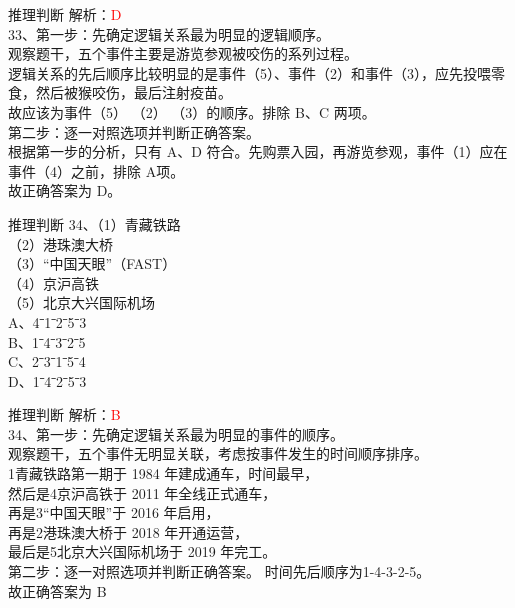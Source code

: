 \documentclass[aspectratio=169]{beamer}
\begin{document}
\begin{frame}[t]{推理判断}
    解析：\textcolor{red}{D}\\
    33、第一步：先确定逻辑关系最为明显的逻辑顺序。\\
    观察题干，五个事件主要是游览参观被咬伤的系列过程。\\
    逻辑关系的先后顺序比较明显的是事件（5）、事件（2）和事件（3），应先投喂零食，然后被猴咬伤，最后注射疫苗。\\
    故应该为事件（5） （2） （3）的顺序。排除 B、C 两项。\\
    第二步：逐一对照选项并判断正确答案。\\
    根据第一步的分析，只有 A、D 符合。先购票入园，再游览参观，事件（1）应在事件（4）之前，排除 A项。\\
    故正确答案为 D。\\
\end{frame}





\begin{frame}[t]{推理判断}
    34、（1）青藏铁路\\
    （2）港珠澳大桥\\
    （3）“中国天眼”（FAST）\\
    （4）京沪高铁\\
    （5）北京大兴国际机场\\
    A、4ˉ1ˉ2ˉ5ˉ3\\
    B、1ˉ4ˉ3ˉ2ˉ5\\
    C、2ˉ3ˉ1ˉ5ˉ4\\
    D、1ˉ4ˉ2ˉ5ˉ3\\
\end{frame}


\begin{frame}[t]{推理判断}
    解析：\textcolor{red}{B}\\
    34、第一步：先确定逻辑关系最为明显的事件的顺序。\\
    观察题干，五个事件无明显关联，考虑按事件发生的时间顺序排序。\\
    1青藏铁路第一期于 1984 年建成通车，时间最早，\\
    然后是4京沪高铁于 2011 年全线正式通车，\\
    再是3“中国天眼”于 2016 年启用，\\
    再是2港珠澳大桥于 2018 年开通运营，\\
    最后是5北京大兴国际机场于 2019 年完工。\\
    第二步：逐一对照选项并判断正确答案。
    时间先后顺序为1-4-3-2-5。\\
    故正确答案为 B\\
\end{frame}
\end{document}
